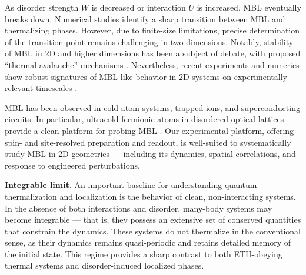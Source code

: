 




As disorder strength $W$ is decreased or interaction $U$ is increased, MBL eventually breaks down. Numerical studies identify a sharp transition between MBL and thermalizing phases. 
However, due to finite-size limitations, precise determination of the transition point remains challenging in two dimensions. Notably, stability of MBL in 2D and higher dimensions has been a subject of debate, with proposed “thermal avalanche” mechanisms \cite{de_roeck_stability_2017}. Nevertheless, recent experiments and numerics show robust signatures of MBL-like behavior in 2D systems on experimentally relevant timescales \cite{choi_exploring_2016,bordia_probing_2017,wahl_signatures_2019}.

MBL has been observed in cold atom systems, trapped ions, and superconducting circuits. In particular, ultracold fermionic atoms in disordered optical lattices provide a clean platform for probing MBL \cite{schreiber_observation_2015,kondov_disorder-induced_2015,choi_exploring_2016}. Our experimental platform, offering spin- and site-resolved preparation and readout, is well-suited to systematically study MBL in 2D geometries — including its dynamics, spatial correlations, and response to engineered perturbations.





\textbf{Integrable limit}.
An important baseline for understanding quantum thermalization and localization is the behavior of clean, non-interacting systems. In the absence of both interactions and disorder, many-body systems may become integrable — that is, they possess an extensive set of conserved quantities that constrain the dynamics. These systems do not thermalize \cite{abanin_colloquium_2019} in the conventional sense, as their dynamics remains quasi-periodic and retains detailed memory of the initial state. This regime provides a sharp contrast to both ETH-obeying thermal systems and disorder-induced localized phases.

